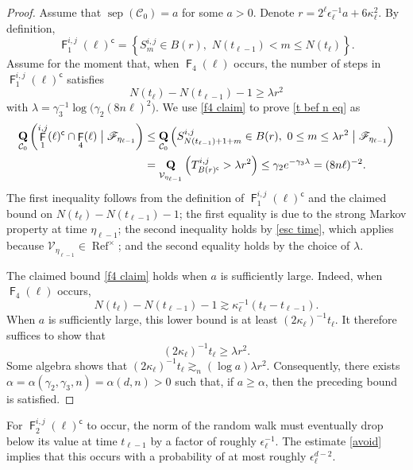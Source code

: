 \documentclass[11pt,reqno]{amsart}
\theoremstyle{definition}
\numberwithin{equation}{section}
\newcommand{\1}{\mathbf{1}}
\newcommand{\eps}{\epsilon}
\DeclareMathOperator{\QQ}{\mathbf{Q}}
\DeclareMathOperator{\PPprod}{\mathbf{Q}}
\DeclareMathOperator{\sep}{sep}
\DeclareMathOperator{\Refcon}{\mathrm{Ref}}
\newcommand{\cc}{\mathsf{c}}
\DeclareMathOperator{\FF}{\mathsf{F}}
\newcommand{\CC}{\mathcal{C}}
\newcommand{\VV}{\mathcal{V}}
\newcommand{\scr}{\mathscr}
\begin{document}
\begin{proof}
Assume that $\sep (\CC_0) = a$ for some $a > 0$. Denote $r = 2^\ell \eps_\ell^{-1} a + 6 \kappa_\ell^2$. By definition,
\[
\FF_1^{i,j} (\ell)^\cc = \left\{ S_{m}^{i,j} \in B(r), \,\, N(t_{\ell-1}) < m \leq N(t_{\ell}) \right\}.
\]
Assume for the moment that, when $\FF_4 (\ell)$ occurs, the number of steps in $\FF_1^{i,j} (\ell)^\cc$ satisfies
\begin{equation}\label{f4 claim}
N(t_\ell) - N(t_{\ell-1}) - 1 \geq \lambda r^2
\end{equation}
with $\lambda = \gamma_3^{-1} \log \big(\gamma_2 (8 n \ell)^2 \big)$. We use \eqref{f4 claim} to prove \eqref{t bef n eq} as
\begin{align*}
\PPprod_{\CC_0} \left( \FF_1^{i,j} (\ell)^\cc \cap \FF_4 (\ell) \bigm\vert \mathscr{F}_{\eta_{\ell-1}} \right) &\leq \QQ_{\CC_0} \left( S_{N(t_{\ell-1}) + 1 + m}^{i,j} \in B(r), \,\, 0 \leq m \leq \lambda r^2 \bigm\vert \scr{F}_{\eta_{\ell-1}} \right)\\ 
&= \QQ_{\VV_{\eta_{\ell-1}}} \left( T^{i,j}_{B(r)^\cc} > \lambda r^2 \right) \leq \gamma_2 e^{-\gamma_3 \lambda}  = (8n\ell)^{-2}.
\end{align*}
The first inequality follows from the definition of $\FF_1^{i,j} (\ell)^\cc$ and the claimed bound on $N(t_\ell)-N(t_{\ell-1})-1$; the first equality is due to the strong Markov property at time $\eta_{\ell-1}$; the second inequality holds by \eqref{esc time}, which applies because $\VV_{\eta_{\ell-1}} \in \Refcon^\times$; and the second equality holds by the choice of $\lambda$.

The claimed bound \eqref{f4 claim} holds when $a$ is sufficiently large. Indeed, when $\FF_4 (\ell)$ occurs, 
\[
N(t_\ell) - N(t_{\ell-1}) -1 \gtrsim \kappa_\ell^{-1} (t_\ell - t_{\ell-1}).
\]
When $a$ is sufficiently large, this lower bound is at least $(2\kappa_\ell)^{-1} t_\ell$. It therefore suffices to show that
\[
(2\kappa_\ell)^{-1} t_\ell \geq \lambda r^2.
\]
Some algebra shows that $(2\kappa_\ell)^{-1} t_\ell \gtrsim_n (\log a) \lambda r^2$. Consequently, there exists $\alpha = \alpha(\gamma_2,\gamma_3,n) = \alpha (d,n) > 0$ such that, if $a \geq \alpha$, then the preceding bound is satisfied.
\end{proof}

For $\FF_2^{i,j} (\ell)^\cc$ to occur, the norm of the random walk must eventually drop below its value at time $t_{\ell-1}$ by a factor of roughly $\eps_\ell^{-1}$. The estimate \eqref{avoid} implies that this occurs with a probability of at most roughly $\eps_\ell^{d-2}$.
\end{document}
